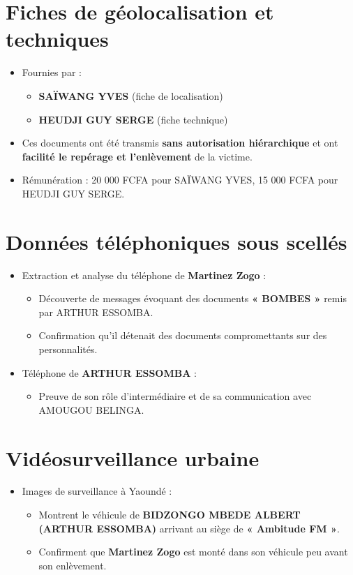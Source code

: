 \documentclass[12pt, a4em]{article}
\begin{document}
	\section*{Fiches de géolocalisation et techniques}
	\begin{itemize}[leftmargin=*]
		\item Fournies par :
		\begin{itemize}
			\item \textbf{SAÏWANG YVES} (fiche de localisation)
			\item \textbf{HEUDJI GUY SERGE} (fiche technique)
		\end{itemize}
		\item Ces documents ont été transmis \textbf{sans autorisation hiérarchique} et ont \textbf{facilité le repérage et l'enlèvement} de la victime.
		\item Rémunération : 20 000 FCFA pour SAÏWANG YVES, 15 000 FCFA pour HEUDJI GUY SERGE.
	\end{itemize}
	
	\section*{Données téléphoniques sous scellés}
	\begin{itemize}[leftmargin=*]
		\item Extraction et analyse du téléphone de \textbf{Martinez Zogo} :
		\begin{itemize}
			\item Découverte de messages évoquant des documents \textbf{« BOMBES »} remis par ARTHUR ESSOMBA.
			\item Confirmation qu'il détenait des documents compromettants sur des personnalités.
		\end{itemize}
		\item Téléphone de \textbf{ARTHUR ESSOMBA} :
		\begin{itemize}
			\item Preuve de son rôle d'intermédiaire et de sa communication avec AMOUGOU BELINGA.
		\end{itemize}
	\end{itemize}
	
	\section*{Vidéosurveillance urbaine}
	\begin{itemize}[leftmargin=*]
		\item Images de surveillance à Yaoundé :
		\begin{itemize}
			\item Montrent le véhicule de \textbf{BIDZONGO MBEDE ALBERT (ARTHUR ESSOMBA)} arrivant au siège de \textbf{« Ambitude FM »}.
			\item Confirment que \textbf{Martinez Zogo} est monté dans son véhicule peu avant son enlèvement.
		\end{itemize}
	\end{itemize}
	
\end{document}
